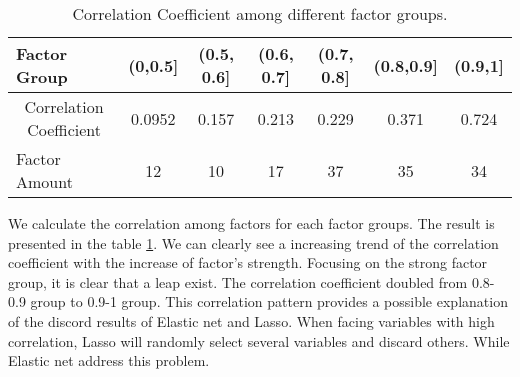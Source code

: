 \begin{table}[h]
	\centering
	\caption{Correlation Coefficient among different factor groups. }
	\label{table:Correlation}
	\begin{tabular}{l|cccccc}
		\hline
		\hline
		Factor Group                                 & (0,0.5{]} & (0.5, 0.6{]} & (0.6, 0.7{]} & (0.7, 0.8{]} & (0.8,0.9{]} & (0.9,1{]} \\ \hline
		\multicolumn{1}{c|}{Correlation Coefficient} & 0.0952    & 0.157        & 0.213        & 0.229        & 0.371       & 0.724   \\
		Factor Amount &12 & 10 &  17 & 37& 35 &34  \\ \hline \hline
	\end{tabular}
\end{table}

We calculate the correlation among factors for each factor groups.
The result is presented in the table \ref{table:Correlation}.
We can clearly see a increasing trend of the correlation coefficient with the increase of factor's strength.
Focusing on the strong factor group, it is clear that a leap exist.
The correlation coefficient doubled from 0.8-0.9 group to 0.9-1 group.
This correlation pattern provides a possible explanation of the discord results of Elastic net and Lasso.
When facing variables with high correlation, Lasso will randomly select several variables and discard others.
While Elastic net address this problem. 


